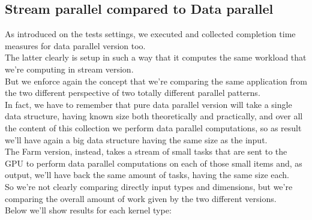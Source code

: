 \subsection{Stream parallel compared to Data parallel}
As introduced on the tests settings, we executed and collected completion time measures for data parallel version too.\\
The latter clearly is setup in such a way that it computes the same workload that we're computing in stream version.\\
But we enforce again the concept that we're comparing the same application from the two different perspective of two totally different parallel patterns.\\
In fact, we have to remember that pure data parallel version will take a single data structure, having known size both theoretically and practically, and over all the content of this collection we perform data parallel computations, so as result we'll have again a big data structure having the same size as the input.\\
The Farm version, instead, takes a stream of small tasks that are sent to the GPU to perform data parallel computations on each of those small items and, as output, we'll have back the same amount of tasks, having the same size each.\\
So we're not clearly comparing directly input types and dimensions, but we're comparing the overall amount of work given by the two different versions.\\
Below we'll show results for each kernel type:
